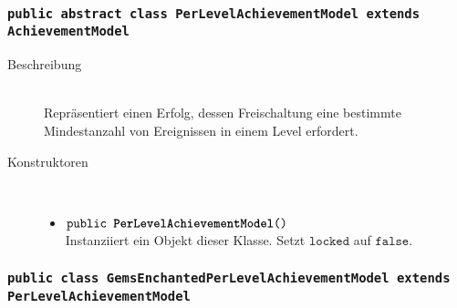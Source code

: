 \subsubsection{\normalfont \texttt{public abstract class \textbf{PerLevelAchievementModel} extends AchievementModel}}

\begin{description}
\item[Beschreibung] \hfill \\ Repräsentiert einen Erfolg, dessen Freischaltung eine bestimmte Mindestanzahl von Ereignissen in einem Level erfordert.

\item[Konstruktoren] \hfill \\
	\vspace{-.8cm}
	\begin{itemize}
		\item $\texttt{public \textbf{PerLevelAchievementModel}()}$ \\ Instanziiert ein Objekt dieser Klasse. Setzt $\texttt{locked}$ auf $\texttt{false}$.
	\end{itemize}

\end{description}



\subsubsection{\normalfont \texttt{public class \textbf{GemsEnchantedPerLevelAchievementModel} extends PerLevelAchievementModel}}

